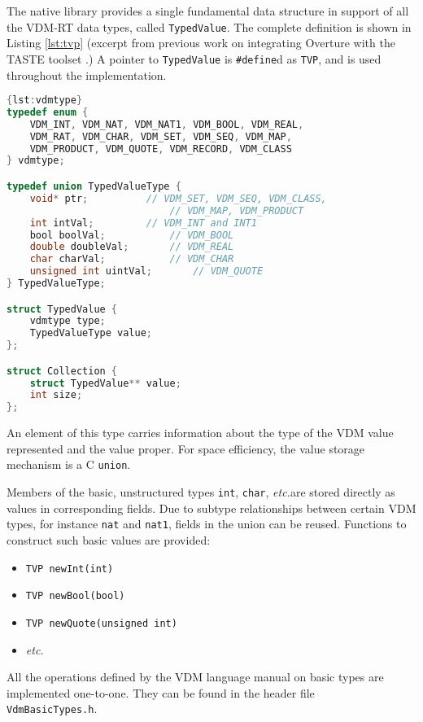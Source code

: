 The native library provides a single fundamental data structure in support of all the VDM-RT data types, called \texttt{TypedValue}.
%
The complete definition is shown in Listing \ref{lst:tvp} (excerpt from previous work on integrating Overture with the TASTE toolset \cite{Fabbri&16}.)
%
A pointer to \texttt{TypedValue} is \texttt{\#define}d as \texttt{TVP}, and is used throughout the implementation.
%
%
%
\begin{lstlisting}[language=C,caption={Fundamental code generator data type.},label={lst:tvp},frame=tlbr]{lst:vdmtype}
typedef enum {
	VDM_INT, VDM_NAT, VDM_NAT1, VDM_BOOL, VDM_REAL, 
	VDM_RAT, VDM_CHAR, VDM_SET, VDM_SEQ, VDM_MAP,
	VDM_PRODUCT, VDM_QUOTE, VDM_RECORD, VDM_CLASS
} vdmtype;

typedef union TypedValueType {
	void* ptr;			// VDM_SET, VDM_SEQ, VDM_CLASS,
	            			// VDM_MAP, VDM_PRODUCT
	int intVal;			// VDM_INT and INT1
	bool boolVal;			// VDM_BOOL
	double doubleVal;		// VDM_REAL
	char charVal;			// VDM_CHAR
	unsigned int uintVal;		// VDM_QUOTE
} TypedValueType;

struct TypedValue {
	vdmtype type;
	TypedValueType value;
};

struct Collection {
	struct TypedValue** value;
	int size;
};
\end{lstlisting}
%
%
%
An element of this type carries information about the type of the VDM value represented and the value proper.
%
For space efficiency, the value storage mechanism is a C \texttt{union}.

Members of the basic, unstructured types \texttt{int}, \texttt{char}, \emph{etc.}\@ are stored directly as values in corresponding fields.
%
Due to subtype relationships between certain VDM types, for instance \texttt{nat} and \texttt{nat1}, fields in the union can be reused.
%
Functions to construct such basic values are provided:
%
%
%
\begin{itemize}
\item \texttt{TVP newInt(int)}
\item \texttt{TVP newBool(bool)}
\item \texttt{TVP newQuote(unsigned int)}
\item \emph{etc.\@}
\end{itemize}
%
%
%
All the operations defined by the VDM language manual on basic types are implemented one-to-one.
%
They can be found in the header file\\\texttt{VdmBasicTypes.h}.

